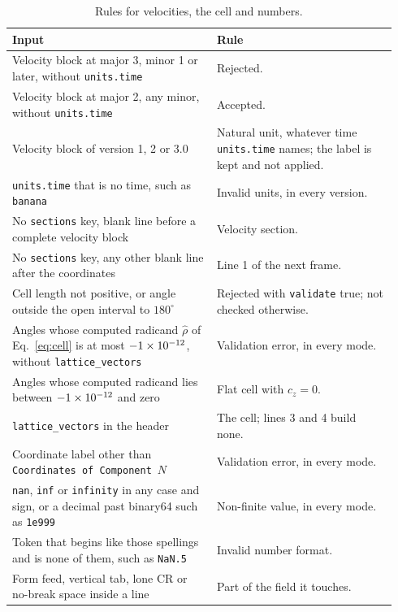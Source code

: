 \documentclass[preprint,12pt]{elsarticle}
\begin{document}
\begin{table}[tbp] \centering \small \caption{Rules for velocities, the cell and numbers.}
\label{tab:rules-numbers}
\begin{tabular}{@{}p{0.50\linewidth}p{0.44\linewidth}@{}}
\toprule
Input & Rule \\
\midrule
Velocity block at major 3, minor 1 or later, without \texttt{units.time} & Rejected. \\
Velocity block at major 2, any minor, without \texttt{units.time} & Accepted. \\
Velocity block of version 1, 2 or 3.0 & Natural unit, whatever time \texttt{units.time} names; the label is kept and not applied. \\
\texttt{units.time} that is no time, such as \texttt{banana} & Invalid units, in every version. \\
No \texttt{sections} key, blank line before a complete velocity block & Velocity section. \\
No \texttt{sections} key, any other blank line after the coordinates & Line 1 of the next frame. \\
Cell length not positive, or angle outside the open interval to \(180^\circ\) & Rejected with \texttt{validate} true; not checked otherwise. \\
Angles whose computed radicand \(\hat\rho\) of Eq.~\eqref{eq:cell} is at most \(-\num{1e-12}\), without \texttt{lattice\_vectors} & Validation error, in every mode. \\
Angles whose computed radicand lies between \(-\num{1e-12}\) and zero & Flat cell with \(c_z=0\). \\
\texttt{lattice\_vectors} in the header & The cell; lines 3 and 4 build none. \\
Coordinate label other than \texttt{Coordinates of Component}~\(N\) & Validation error, in every mode. \\
\texttt{nan}, \texttt{inf} or \texttt{infinity} in any case and sign, or a decimal past binary64 such as \texttt{1e999} & Non-finite value, in every mode. \\
Token that begins like those spellings and is none of them, such as \texttt{NaN.5} & Invalid number format. \\
Form feed, vertical tab, lone CR or no-break space inside a line & Part of the field it touches. \\
\bottomrule
\end{tabular}
\end{table}
\end{document}

